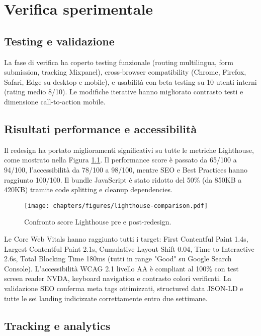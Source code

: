 \chapter{Verifica sperimentale}

\section{Testing e validazione}

La fase di verifica ha coperto testing funzionale (routing multilingua, form 
submission, tracking Mixpanel), cross-browser compatibility (Chrome, Firefox, 
Safari, Edge su desktop e mobile), e usabilità con beta testing su 10 utenti 
interni (rating medio 8/10). Le modifiche iterative hanno migliorato contrasto 
testi e dimensione call-to-action mobile.

\section{Risultati performance e accessibilità}

Il redesign ha portato miglioramenti significativi su tutte le metriche Lighthouse, 
come mostrato nella Figura \ref{fig:lighthouse-comparison}. Il performance score 
è passato da 65/100 a 94/100, l'accessibilità da 78/100 a 98/100, mentre SEO e 
Best Practices hanno raggiunto 100/100. Il bundle JavaScript è stato ridotto del 
50\% (da 850KB a 420KB) tramite code splitting e cleanup dependencies.

\begin{figure}[h!]
    \centering
    \texttt{[image: chapters/figures/lighthouse-comparison.pdf]}
    \caption{Confronto score Lighthouse pre e post-redesign.}
    \label{fig:lighthouse-comparison}
\end{figure}

Le Core Web Vitals hanno raggiunto tutti i target: First Contentful Paint 1.4s, 
Largest Contentful Paint 2.1s, Cumulative Layout Shift 0.04, Time to Interactive 
2.6s, Total Blocking Time 180ms (tutti in range "Good" su Google Search Console). 
L'accessibilità WCAG 2.1 livello AA è compliant al 100\% con test screen reader 
NVDA, keyboard navigation e contrasto colori verificati. La validazione SEO 
conferma meta tags ottimizzati, structured data JSON-LD e tutte le sei landing 
indicizzate correttamente entro due settimane.

\section{Tracking e analytics}

